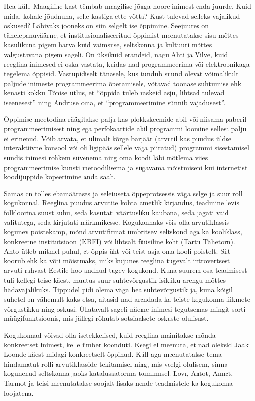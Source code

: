 Hea küll. Maagiline kast tõmbab maagilise jõuga noore inimest enda juurde. Kuid mida, kohale jõudnuna, selle kastiga ette võtta? Kust tulevad selleks vajalikud oskused? Läbivaks jooneks on siin selgelt ise õppimine. Seejuures on tähelepanuväärne, et institusionaliseeritud õppimist meenutatakse sisu mõttes kasulikuna pigem harva kuid vaimsuse, seltskonna ja kultuuri mõttes valgustavana pigem sageli. On üksikuid erandeid, nagu Ahti ja Vilve, kuid reeglina inimesed ei oska vastata, kuidas nad programmeerima või elektroonikaga tegelema õppisid. Vastupidiselt tänasele, kus tundub suund olevat võimalikult paljude inimeste programmeerima õpetamisele, võtavad toonase suhtumise ehk kenasti kokku Tõnise ütlus, et \enquote{õppida tuleb raskeid asju, lihtsad tulevad iseenesest} ning Andruse oma, et  \enquote{programmeerimine sünnib vajadusest}. 

Õppimise meetodina räägitakse palju kas plokkskeemide abil või niisama paberil programmeerimisest ning ega perfokaartide abil programmi loomine sellest palju ei erinenud. Võib arvata, et ülimalt kõrge barjäär (arvutil kas puudus üldse interaktiivne konsool või oli ligipääs sellele väga piiratud) programmi sisestamisel sundis inimesi rohkem süvenema ning oma koodi läbi mõtlema viies programmeerimise kunsti metoodilisema ja sügavama mõistmiseni kui internetist koodijuppide kopeerimine anda saab.

Samas on  tolles ebamäärases ja seletuseta õppeprotsessis väga selge ja suur roll kogukonnal. Reeglina puudus arvutite kohta ametlik kirjandus, teadmine levis folkloorina suust suhu, seda kasutati väärtusliku kaubana, seda jagati vaid valitutega, seda kirjutati märkmikesse. Kogukonnaks võis olla arvutiklassis kogunev poistekamp, mõnd arvutifirmat ümbritsev seltskond aga ka kooliklass, konkreetne institutsioon (KBFI) või lihtsalt füüsiline koht (Tartu Tähetorn). Anto ütleb mitmel puhul, et õppis üht või teist asja oma kooli poistelt. Siit koorub ehk ka võti mõistmaks, miks kujunes reeglina tugevalt introvertsest arvuti-rahvast Eestile hoo andnud tugev kogukond. Kuna suurem osa teadmisest tuli kellegi teise käest, muutus suur suhtevõrgustik isikliku arengu mõttes hädavajalikuks. Tippudel pidi olema väga hea suhtevõrgustik ja, kuna kõigil suhetel on vähemalt kaks otsa, aitasid nad arendada ka teiste kogukonna liikmete võrgustikku ning oskusi. Üllatavalt sageli näeme inimesi tegutsemas mingit sorti müügifunktsioonis, mis jällegi rõhutab sotsiaalsete oskuste olulisust. 

Kogukonnad võivad olla isetekkelised, kuid reeglina mainitakse mõnda konkreetset inimest, kelle ümber koonduti. Keegi ei meenuta, et nad oleksid Jaak Loonde käest midagi konkreetselt õppinud. Küll aga meenutatakse tema hindamatut rolli arvutiklasside tekitamisel ning, mis veelgi olulisem, sinna kogunenud seltskonna jaoks katalüsaatorina toimimisel. Lõvi, Antot, Annet, Tarmot ja teisi meenutatakse soojalt lisaks nende teadmistele ka kogukonna loojatena. 

